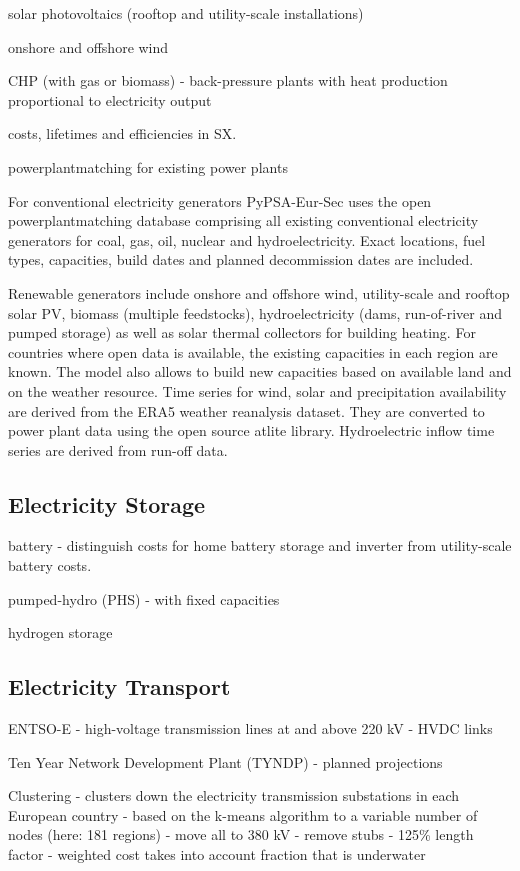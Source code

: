solar photovoltaics (rooftop and utility-scale installations)

onshore and offshore wind

CHP (with gas or biomass)
- back-pressure plants with heat production proportional to electricity output

costs, lifetimes and efficiencies in SX.

powerplantmatching for existing power plants

For conventional electricity generators PyPSA-Eur-Sec uses the open
powerplantmatching database comprising all existing conventional electricity
generators for coal, gas, oil, nuclear and hydroelectricity. Exact locations,
fuel types, capacities, build dates and planned decommission dates are included.

Renewable generators include onshore and offshore wind, utility-scale and
rooftop solar PV, biomass (multiple feedstocks), hydroelectricity (dams,
run-of-river and pumped storage) as well as solar thermal collectors for
building heating. For countries where open data is available, the existing
capacities in each region are known. The model also allows to build new
capacities based on available land and on the weather resource. Time series for
wind, solar and precipitation availability are derived from the ERA5 weather
reanalysis dataset. They are converted to power plant data using the open source
atlite library. Hydroelectric inflow time series are derived from run-off data.

\subsection{Electricity Storage}

battery
- distinguish costs for home battery storage and inverter from utility-scale battery costs.

pumped-hydro (PHS)
- with fixed capacities

hydrogen storage

\subsection{Electricity Transport}

ENTSO-E
- high-voltage transmission lines at and above 220 kV
- HVDC links

Ten Year Network Development Plant (TYNDP)
- planned projections

Clustering
- clusters down the electricity transmission substations in each European country
- based on the k-means algorithm to a variable number of nodes (here: 181 regions)
- move all to 380 kV
- remove stubs
- 125\% length factor
- weighted cost takes into account fraction that is underwater

